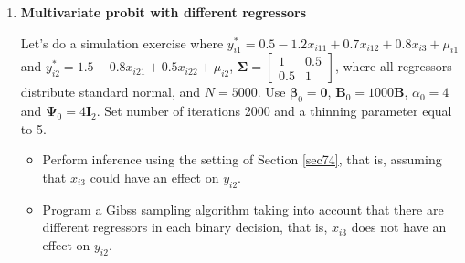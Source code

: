 \begin{enumerate}
\item \textbf{Multivariate probit with different regressors}

Let's do a simulation exercise where $y_{i1}^*=0.5-1.2x_{i11}+0.7x_{i12}+0.8x_{i3}+\mu_{i1}$ and $y_{i2}^*=1.5-0.8x_{i21}+0.5x_{i22}+\mu_{i2}$, $\bm{\Sigma}=\begin{bmatrix}
	1 & 0.5\\
	0.5 & 1
\end{bmatrix}$, where all regressors distribute standard normal, and $N=5000$. Use $\bm{\beta}_0=\bm{0}$, $\bm{B}_0=1000\bm{B}$, $\alpha_0=4$ and $\bm{\Psi}_0=4\bm{I}_2$. Set number of iterations 2000 and a thinning parameter equal to 5.  

\begin{itemize}
	\item Perform inference using the setting of Section \ref{sec74}, that is, assuming that $x_{i3}$ could have an effect on $y_{i2}$.
	\item Program a Gibss sampling algorithm taking into account that there are different regressors in each binary decision, that is, $x_{i3}$ does not have an effect on $y_{i2}$. 
\end{itemize}      

\end{enumerate}


